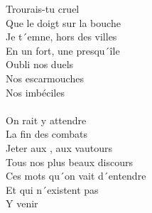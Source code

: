 
Trourais-tu cruel \\
Que le doigt sur la bouche \\
Je t´emne, hors des villes \\
En un fort, une presqu´île \\
Oubli nos duels \\
Nos escarmouches \\
Nos  imbéciles \\
~\\
On rait y attendre \\
La fin des combats \\
Jeter aux , aux vautours \\
Tous nos plus beaux discours \\
Ces mots qu´on vait d´entendre \\
Et qui n´existent pas \\
Y venir    
